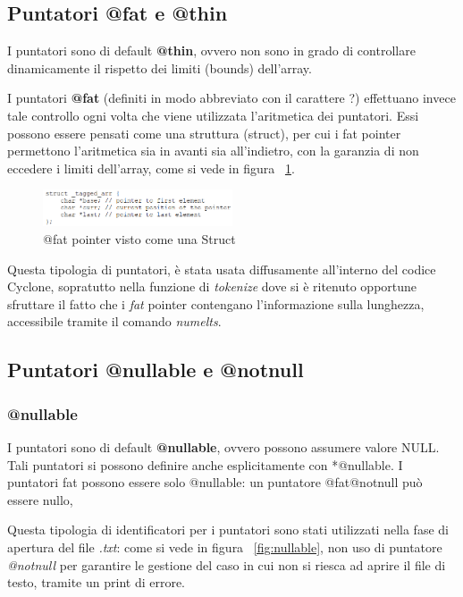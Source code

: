 \subsection{Puntatori @fat e @thin}
I puntatori sono di default \textbf{@thin}, ovvero non sono in grado di controllare dinamicamente il rispetto dei limiti (bounds) dell’array.

I puntatori \textbf{@fat} (definiti in modo abbreviato con il carattere ?) effettuano invece tale controllo ogni volta che viene utilizzata l’aritmetica dei puntatori.
Essi possono essere pensati come una struttura (struct), per cui i fat pointer permettono l’aritmetica sia in avanti sia all’indietro, con la garanzia di non eccedere i limiti dell’array, come si vede in figura ~\ref{fig:fatStruct}.

\begin{figure}[h]
	\centering
	\includegraphics[width=0.5\textwidth]{Immagini/FatPointerStruct.png}
	\caption{@fat pointer visto come una Struct}
	\label{fig:fatStruct}
\end{figure}

Questa tipologia di puntatori, è stata usata diffusamente all'interno del codice Cyclone, sopratutto nella funzione di \textit{tokenize} dove si è ritenuto opportune sfruttare il fatto che i \textit{fat} pointer contengano l'informazione sulla lunghezza, accessibile tramite il comando \textit{numelts}.

\subsection{Puntatori @nullable e @notnull}
\subsubsection{@nullable}
I puntatori sono di default \textbf{@nullable}, ovvero possono assumere valore NULL. Tali puntatori si possono definire anche esplicitamente con *@nullable. 
I puntatori fat possono essere solo @nullable: un puntatore @fat@notnull può essere nullo,

Questa tipologia di identificatori per i puntatori sono stati utilizzati nella fase di apertura del file \textit{.txt}: come si vede in figura ~\ref{fig:nullable}, non  uso di puntatore \textit{@notnull} per garantire le gestione del caso in cui non si riesca ad aprire il file di testo, tramite un print di errore.

